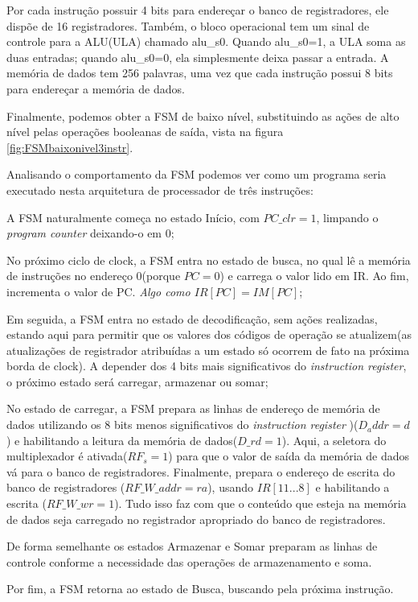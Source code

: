 \documentclass{article}
\begin{document}
Por cada instrução possuir 4 bits para endereçar o banco de registradores, ele dispõe de 16 registradores. Também, o bloco operacional tem um sinal de controle para a ALU(ULA) chamado alu\_s0. Quando alu\_s0=1, a ULA soma as duas entradas; quando alu\_s0=0, ela simplesmente deixa passar a entrada.
A memória de dados tem 256 palavras, uma vez que cada instrução possui 8 bits para endereçar a memória de dados.

Finalmente, podemos obter a FSM de baixo nível, substituindo as ações de alto nível pelas operações booleanas de saída, vista na figura \ref{fig:FSMbaixonivel3instr}.
 
Analisando o comportamento da FSM podemos ver como um programa seria executado nesta arquitetura de processador de três instruções:

\begin{boxlabel}
     \item A FSM naturalmente começa no estado Início, com $PC\_clr=1$, limpando o \textit{program counter} deixando-o em 0;
     \item No próximo ciclo de clock, a FSM entra no estado de busca, no qual lê a memória de instruções no endereço 0(porque $PC=0$) e carrega o valor lido em IR. Ao fim, incrementa o valor de PC. \textit{Algo como $IR[PC]=IM[PC]$};
     \item Em seguida, a FSM entra no estado de decodificação, sem ações realizadas, estando aqui para permitir que os valores dos códigos de operação se atualizem(as atualizações de registrador atribuídas a um estado só ocorrem de fato na próxima borda de clock). A depender dos 4 bits mais significativos do \textit{instruction register}, o próximo estado será carregar, armazenar ou somar;
     \item No estado de carregar, a FSM prepara as linhas de endereço de memória de dados utilizando os 8 bits menos significativos do \textit{instruction register} )($D_addr=d$) e habilitando a leitura da memória de dados($D\_rd=1$). Aqui, a seletora do multiplexador é ativada($RF_s=1$) para que o valor de saída da memória de dados vá para o banco de registradores. Finalmente, prepara o endereço de escrita do banco de registradores ($RF\_W\_addr=ra$), usando $IR[11...8]$ e habilitando a escrita ($RF\_W\_wr=1$). Tudo isso faz com que o conteúdo que esteja na memória de dados seja carregado no registrador apropriado do banco de registradores.
     \item De forma semelhante os estados Armazenar e Somar preparam as linhas de controle conforme a necessidade das operações de armazenamento e soma.
     \item Por fim, a FSM retorna ao estado de Busca, buscando pela próxima instrução.
\end{boxlabel}
\end{document}

